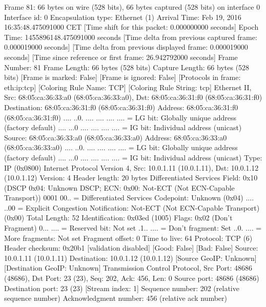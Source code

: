 Frame 81: 66 bytes on wire (528 bits), 66 bytes captured (528 bits) on interface 0
    Interface id: 0
    Encapsulation type: Ethernet (1)
    Arrival Time: Feb 19, 2016 16:35:48.475091000 CET
    [Time shift for this packet: 0.000000000 seconds]
    Epoch Time: 1455896148.475091000 seconds
    [Time delta from previous captured frame: 0.000019000 seconds]
    [Time delta from previous displayed frame: 0.000019000 seconds]
    [Time since reference or first frame: 26.942792000 seconds]
    Frame Number: 81
    Frame Length: 66 bytes (528 bits)
    Capture Length: 66 bytes (528 bits)
    [Frame is marked: False]
    [Frame is ignored: False]
    [Protocols in frame: eth:ip:tcp]
    [Coloring Rule Name: TCP]
    [Coloring Rule String: tcp]
Ethernet II, Src: 68:05:ca:36:33:a0 (68:05:ca:36:33:a0), Dst: 68:05:ca:36:31:f0 (68:05:ca:36:31:f0)
    Destination: 68:05:ca:36:31:f0 (68:05:ca:36:31:f0)
        Address: 68:05:ca:36:31:f0 (68:05:ca:36:31:f0)
        .... ..0. .... .... .... .... = LG bit: Globally unique address (factory default)
        .... ...0 .... .... .... .... = IG bit: Individual address (unicast)
    Source: 68:05:ca:36:33:a0 (68:05:ca:36:33:a0)
        Address: 68:05:ca:36:33:a0 (68:05:ca:36:33:a0)
        .... ..0. .... .... .... .... = LG bit: Globally unique address (factory default)
        .... ...0 .... .... .... .... = IG bit: Individual address (unicast)
    Type: IP (0x0800)
Internet Protocol Version 4, Src: 10.0.1.11 (10.0.1.11), Dst: 10.0.1.12 (10.0.1.12)
    Version: 4
    Header length: 20 bytes
    Differentiated Services Field: 0x10 (DSCP 0x04: Unknown DSCP; ECN: 0x00: Not-ECT (Not ECN-Capable Transport))
        0001 00.. = Differentiated Services Codepoint: Unknown (0x04)
        .... ..00 = Explicit Congestion Notification: Not-ECT (Not ECN-Capable Transport) (0x00)
    Total Length: 52
    Identification: 0x03ed (1005)
    Flags: 0x02 (Don't Fragment)
        0... .... = Reserved bit: Not set
        .1.. .... = Don't fragment: Set
        ..0. .... = More fragments: Not set
    Fragment offset: 0
    Time to live: 64
    Protocol: TCP (6)
    Header checksum: 0x20b1 [validation disabled]
        [Good: False]
        [Bad: False]
    Source: 10.0.1.11 (10.0.1.11)
    Destination: 10.0.1.12 (10.0.1.12)
    [Source GeoIP: Unknown]
    [Destination GeoIP: Unknown]
Transmission Control Protocol, Src Port: 48686 (48686), Dst Port: 23 (23), Seq: 202, Ack: 456, Len: 0
    Source port: 48686 (48686)
    Destination port: 23 (23)
    [Stream index: 1]
    Sequence number: 202    (relative sequence number)
    Acknowledgment number: 456    (relative ack number)
